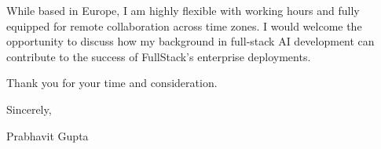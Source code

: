 \documentclass[11pt,a4paper]{article}
\begin{document}
\vspace{1em}

\noindent While based in Europe, I am highly flexible with working hours and fully equipped for remote collaboration across time zones. I would welcome the opportunity to discuss how my background in full-stack AI development can contribute to the success of FullStack’s enterprise deployments.

\vspace{1em}

\noindent Thank you for your time and consideration.

\vspace{2em}

\noindent Sincerely,

\vspace{1em}

\noindent Prabhavit Gupta
\end{document}
